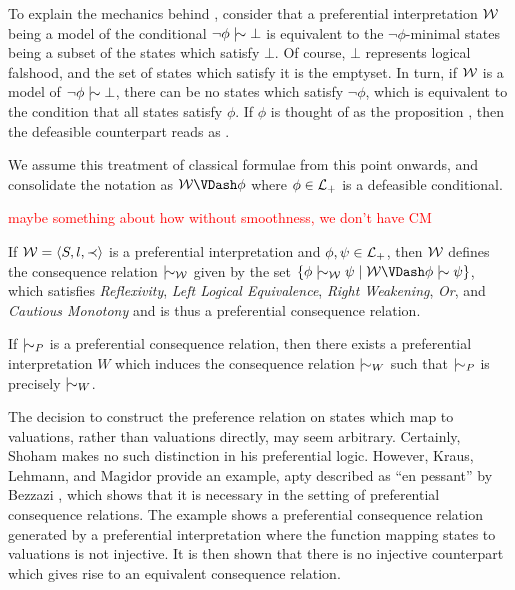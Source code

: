 To explain the mechanics behind , consider that a preferential interpretation $\mathcal{W}$
being a model of the conditional $\neg \phi \twiddle \bot$ is equivalent to the $\neg \phi$-minimal states being a
subset of the states which satisfy $\bot$. Of course, $\bot$ represents logical falshood, and the set of states which satisfy
it is the emptyset. In turn, if $\mathcal{W}$ is a model of $\neg \phi \twiddle \bot$, there can be no states which satisfy
$\neg \phi$, which is equivalent to the condition that all states satisfy $\phi$. If $\phi$ is thought of as the
proposition , then the defeasible counterpart reads as 
\cite{kraus1990nonmonotonic,lehmann1992what}.

We assume this treatment of classical formulae from this point onwards, and consolidate the notation as
$\pin \VDash \phi$ where $\phi \in \mathcal{L}_+$ is a defeasible conditional.

\textcolor{red}{maybe something about how without smoothness, we don't have CM}

\begin{theorem}[Soundness]
	\label{theorem:soundness-preferential}

	If $\mathcal{W} = \langle S,l,\prec \rangle$ is a preferential interpretation and $\phi, \psi \in \mathcal{L}_+$, then $\mathcal{W}$ defines the consequence relation $\twiddle
	_{\pin}$ given by the set $\{\phi \twiddle_{\pin}\psi \mid \pin \VDash \phi \twiddle \psi\}$, which satisfies \textit{Reflexivity},
	\textit{Left Logical Equivalence}, \textit{Right Weakening}, \textit{Or}, and \textit{Cautious Monotony} and is thus a
	preferential consequence relation.
\end{theorem}

\begin{theorem}[Completeness]
	\label{theorem:completeness-preferential}

	If $\twiddle_{P}$ is a preferential consequence relation, then there exists a preferential interpretation $W$ which induces
	the consequence relation $\twiddle_{W}$ such that $\twiddle_{P}$ is precisely $\twiddle_{W}$.
\end{theorem}

The decision to construct the preference relation on states which map to valuations, rather than valuations directly,
may seem arbitrary. Certainly, Shoham \cite{shohamSemanticApproach} makes no such distinction in his preferential logic.
However, Kraus, Lehmann, and Magidor \cite{kraus1990nonmonotonic} provide an example, apty described as ``en pessant'' by
Bezzazi \cite{Bezzazi1997}, which shows that it is necessary in the setting of preferential consequence relations. The example
shows a preferential consequence relation generated by a preferential interpretation where the function mapping states to
valuations is not injective. It is then shown that there is no injective counterpart which gives rise to an equivalent
consequence relation.


